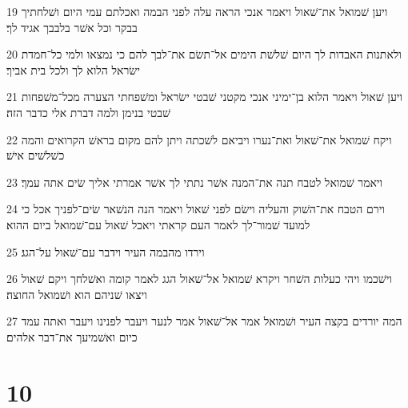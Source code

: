 \par 19 ויען שׁמואל את־שׁאול ויאמר אנכי הראה עלה לפני הבמה ואכלתם עמי היום ושׁלחתיך בבקר וכל אשׁר בלבבך אגיד לך׃
\par 20 ולאתנות האבדות לך היום שׁלשׁת הימים אל־תשׂם את־לבך להם כי נמצאו ולמי כל־חמדת ישׂראל הלוא לך ולכל בית אביך׃
\par 21 ויען שׁאול ויאמר הלוא בן־ימיני אנכי מקטני שׁבטי ישׂראל ומשׁפחתי הצערה מכל־משׁפחות שׁבטי בנימן ולמה דברת אלי כדבר הזה׃
\par 22 ויקח שׁמואל את־שׁאול ואת־נערו ויביאם לשׁכתה ויתן להם מקום בראשׁ הקרואים והמה כשׁלשׁים אישׁ׃
\par 23 ויאמר שׁמואל לטבח תנה את־המנה אשׁר נתתי לך אשׁר אמרתי אליך שׂים אתה עמך׃
\par 24 וירם הטבח את־השׁוק והעליה וישׂם לפני שׁאול ויאמר הנה הנשׁאר שׂים־לפניך אכל כי למועד שׁמור־לך לאמר העם קראתי ויאכל שׁאול עם־שׁמואל ביום ההוא׃
\par 25 וירדו מהבמה העיר וידבר עם־שׁאול על־הגג׃
\par 26 וישׁכמו ויהי כעלות השׁחר ויקרא שׁמואל אל־שׁאול הגג לאמר קומה ואשׁלחך ויקם שׁאול ויצאו שׁניהם הוא ושׁמואל החוצה׃
\par 27 המה יורדים בקצה העיר ושׁמואל אמר אל־שׁאול אמר לנער ויעבר לפנינו ויעבר ואתה עמד כיום ואשׁמיעך את־דבר אלהים׃

\chapter{10}

